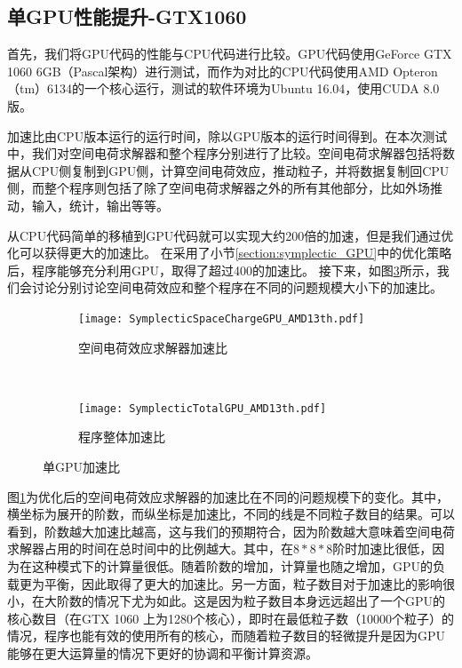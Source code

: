\subsection{单GPU性能提升-GTX1060}
首先，我们将GPU代码的性能与CPU代码进行比较。GPU代码使用GeForce GTX 1060 6GB（Pascal架构）进行测试，而作为对比的CPU代码使用AMD Opteron（tm）6134的一个核心运行，测试的软件环境为Ubuntu 16.04，使用CUDA 8.0版。

加速比由CPU版本运行的运行时间，除以GPU版本的运行时间得到。在本次测试中，我们对空间电荷求解器和整个程序分别进行了比较。空间电荷求解器包括将数据从CPU侧复制到GPU侧，计算空间电荷效应，推动粒子，并将数据复制回CPU侧，而整个程序则包括了除了空间电荷求解器之外的所有其他部分，比如外场推动，输入，统计，输出等等。

从CPU代码简单的移植到GPU代码就可以实现大约200倍的加速，但是我们通过优化可以获得更大的加速比。
在采用了小节\ref{section:symplectic_GPU}中的优化策略后，程序能够充分利用GPU，取得了超过400的加速比。
接下来，如图\ref{fig:OneGPU}所示，我们会讨论分别讨论空间电荷效应和整个程序在不同的问题规模大小下的加速比。

\begin{figure}[!htb]
    \centering
    \begin{subfigure}[b]{0.9\textwidth}
        \texttt{[image: SymplecticSpaceChargeGPU\_AMD13th.pdf]}
        \caption{空间电荷效应求解器加速比}
        \label{fig:SCOpt}
    \end{subfigure}
    \quad
    ~ %
    \begin{subfigure}[b]{0.9\textwidth}
        \texttt{[image: SymplecticTotalGPU\_AMD13th.pdf]}
        \caption{程序整体加速比}
        \label{fig:TotalOpt}
    \end{subfigure}
    \caption{单GPU加速比}\label{fig:OneGPU}
\end{figure}

图\ref{fig:SCOpt}为优化后的空间电荷效应求解器的加速比在不同的问题规模下的变化。其中，横坐标为展开的阶数，而纵坐标是加速比，不同的线是不同粒子数目的结果。可以看到，阶数越大加速比越高，这与我们的预期符合，因为阶数越大意味着空间电荷求解器占用的时间在总时间中的比例越大。其中，在$8*8*8$阶时加速比很低，因为在这种模式下的计算量很低。随着阶数的增加，计算量也随之增加，GPU的负载更为平衡，因此取得了更大的加速比。另一方面，粒子数目对于加速比的影响很小，在大阶数的情况下尤为如此。这是因为粒子数目本身远远超出了一个GPU的核心数目（在GTX 1060 上为1280个核心），即时在最低粒子数（10000个粒子）的情况，程序也能有效的使用所有的核心，而随着粒子数目的轻微提升是因为GPU能够在更大运算量的情况下更好的协调和平衡计算资源。

